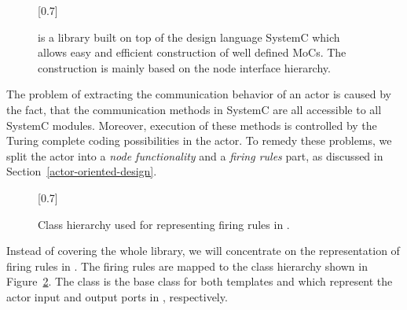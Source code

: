 
\begin{figure}[t]
\begin{center}
\scalebox{0.7}[0.7]{}
\caption{\SysteMoC{} is a library built on top of the design language SystemC
which allows easy and efficient construction of well defined MoCs.
The construction is mainly based on the node interface hierarchy.}
\label{fig:systemc-integration}\label{fig:node-interface-hierarchy}
\end{center}
\end{figure}

The problem of extracting the communication behavior of an actor is caused
by the fact, that the communication methods in SystemC are all accessible
to all SystemC modules. Moreover, execution of these methods is controlled
by the Turing complete coding possibilities in the actor. To remedy these
problems, we split the actor into a \emph{node functionality} and a
\emph{firing rules} part, as discussed in Section~\ref{actor-oriented-design}.

\begin{figure}[t]
\begin{center}
\scalebox{0.7}[0.7]{}
\caption{Class hierarchy used for representing firing rules in \SysteMoC{}.}
\label{fig:systemoc-firing-rules-classes}
\end{center}
\end{figure}

Instead of covering the whole \SysteMoC{} library, we will concentrate
on the representation of firing rules in \SysteMoC{}.
The firing rules are mapped to the class hierarchy shown in
Figure~\ref{fig:systemoc-firing-rules-classes}. The class 
is the base class for both templates  and 
which represent the actor input and output ports in \SysteMoC{}, respectively.

